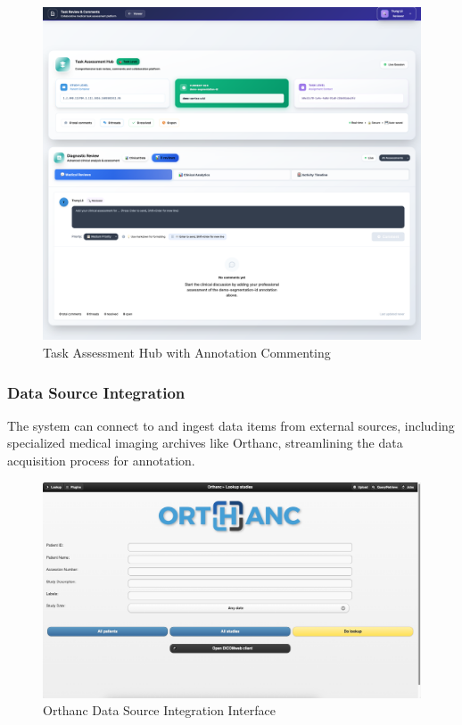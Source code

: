 \begin{figure}[h!]
    \centering
    \includegraphics[width=1\textwidth]{content/resources/features/ohif comment.png}
    \caption{Task Assessment Hub with Annotation Commenting}
    \label{fig:annotation-comments}
\end{figure}

\subsubsection{Data Source Integration}
The system can connect to and ingest data items from external sources, including specialized medical imaging archives like Orthanc, streamlining the data acquisition process for annotation.

\begin{figure}[h!]
    \centering
    \includegraphics[width=1\textwidth]{content//resources//features//orthanc.png}
    \caption{Orthanc Data Source Integration Interface}
    \label{fig:orthanc-integration}
\end{figure}

